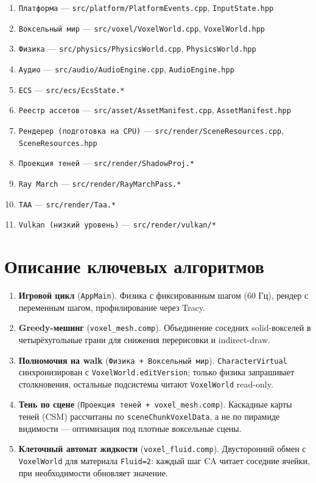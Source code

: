 \begin{enumerate}
\def\labelenumi{\arabic{enumi}.}
\tightlist
\item
  \texttt{Платформа} --- \texttt{src/platform/PlatformEvents.cpp}, \texttt{InputState.hpp}
\item
  \texttt{Воксельный\ мир} --- \texttt{src/voxel/VoxelWorld.cpp}, \texttt{VoxelWorld.hpp}
\item
  \texttt{Физика} --- \texttt{src/physics/PhysicsWorld.cpp}, \texttt{PhysicsWorld.hpp}
\item
  \texttt{Аудио} --- \texttt{src/audio/AudioEngine.cpp}, \texttt{AudioEngine.hpp}
\item
  \texttt{ECS} --- \texttt{src/ecs/EcsState.*}
\item
  \texttt{Реестр\ ассетов} --- \texttt{src/asset/AssetManifest.cpp}, \texttt{AssetManifest.hpp}
\item
  \texttt{Рендерер\ (подготовка\ на\ CPU)} --- \texttt{src/render/SceneResources.cpp}, \texttt{SceneResources.hpp}
\item
  \texttt{Проекция\ теней} --- \texttt{src/render/ShadowProj.*}
\item
  \texttt{Ray\ March} --- \texttt{src/render/RayMarchPass.*}
\item
  \texttt{TAA} --- \texttt{src/render/Taa.*}
\item
  \texttt{Vulkan\ (низкий\ уровень)} --- \texttt{src/render/vulkan/*}
\end{enumerate}

\section{Описание ключевых алгоритмов}\label{KT-2.1_Architecture-ux43eux43fux438ux441ux430ux43dux438ux435-ux43aux43bux44eux447ux435ux432ux44bux445-ux430ux43bux433ux43eux440ux438ux442ux43cux43eux432}

\begin{enumerate}
\def\labelenumi{\arabic{enumi}.}
\item
  \textbf{Игровой цикл} (\texttt{AppMain}). Физика с фиксированным шагом (60 Гц), рендер с переменным шагом, профилирование через Tracy.
\item
  \textbf{Greedy-мешинг} (\texttt{voxel\_mesh.comp}). Объединение соседних solid-вокселей в четырёхугольные грани для снижения перерисовки и indirect-draw.
\item
  \textbf{Полномочия на walk} (\texttt{Физика\ +\ Воксельный\ мир}). \texttt{CharacterVirtual} синхронизирован с \texttt{VoxelWorld.editVersion}; только физика запрашивает столкновения, остальные подсистемы читают \texttt{VoxelWorld} read-only.
\item
  \textbf{Тень по сцене} (\texttt{Проекция\ теней\ +\ voxel\_mesh.comp}). Каскадные карты теней (CSM) рассчитаны по \texttt{sceneChunkVoxelData}, а не по пирамиде видимости --- оптимизация под плотные воксельные сцены.
\item
  \textbf{Клеточный автомат жидкости} (\texttt{voxel\_fluid.comp}). Двусторонний обмен с \texttt{VoxelWorld} для материала \texttt{Fluid=2}: каждый шаг CA читает соседние ячейки, при необходимости обновляет значение.
\end{enumerate}


